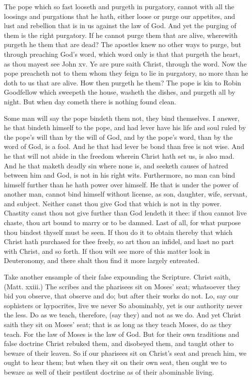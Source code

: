 The pope which so fast looseth and purgeth in purgatory,
cannot with all the loosings and purgations that he 
hath, either loose or purge our appetites, and lust and rebellion
that is in us against the law of God. And yet 
the purging of them is the right purgatory. If he cannot 
purge them that are alive, wherewith purgeth he them 
that are dead? The apostles knew no other ways to 
purge, but through preaching God's word, which word 
only is that that purgeth the heart, as thou mayest see 
John xv. Ye are pure saith Christ, through the word. 
Now the pope preacheth not to them whom they feign to 
lie in purgatory, no more than he doth to us that are alive. 
How then purgeth he them? The pope is kin to Robin 
Goodfellow which sweepeth the house, washeth the dishes, 
and purgeth all by night. But when day cometh there 
is nothing found clean. 

Some man will say the pope bindeth them not, they 
bind themselves. I answer, he that bindeth himself to the 
pope, and had lever have his life and soul ruled by the 
pope's will than by the will of God, and by the pope's 
word, than by the word of God, is a fool. And he that 
had lever be bond than free is not wise. And he that will 
not abide in the freedom wherein Christ hath set us, is 
also mad. And he that maketh deadly sin where none is, 
and seeketh causes of hatred between him and God, is not 
in his right wits. Furthermore, no man can bind himself
further than he hath power over himself. He that 
is under the power of another man, cannot bind himself 
without license, as son, daughter, wife, servant, and 
subject. Neither canst thou give God that which is not 
in thy power. Chastity canst thou not give further than 
God lendeth it thee: if thou cannot live chaste, thou art 
bound to marry or to be damned. Last of all, for what 
purpose thou bindest thyself must be seen. If thou do 
it to obtain thereby that which Christ hath purchased for 
thee freely, so art thou an infidel, and hast no part with 
Christ, and so forth. If thou wilt see more of this matter 
look in Deuteronomy, and there shalt thou find it more 
largely entreated. 

Take another ensample of their false expounding the 
Scripture. Christ saith, (Matt. xxiii.) The scribes and 
the pharisees sit on Moses' seat; whatsoever they bid you 
observe, that observe and do; but after their works do 
not. Lo, say our sophisters or hypocrites, live we never 
So abominably, yet is our authority never the less. Do 
as we teach, therefore, (say they) and not as we do. And 
yet Christ saith they sit on Moses' seat; that is as long as 
they teach Moses, do as they teach. For the law of 
Moses is the law of God. But for their own traditions 
and false doctrine Christ rebuked them, and disobeyed 
them, and taught other to beware of their leaven. So if 
our pharisees sit on Christ's seat and preach him, we 
ought to hear them; but when they sit on their own seat, 
then ought we to beware as well of their pestilent doctrine 
as of their abominable living. 

